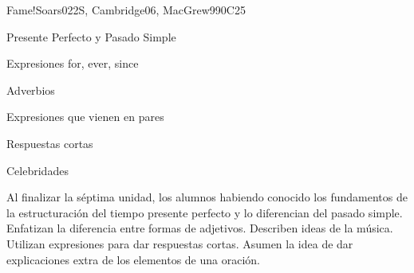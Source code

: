 \begin{syllabus}
\begin{unit}{Fame!}{}{Soars022S, Cambridge06, MacGrew99}{0}{C25}
   \begin{topics}
      \item Presente Perfecto y Pasado Simple
      \item Expresiones for, ever, since
      \item Adverbios
      \item Expresiones que vienen en pares 
      \item Respuestas cortas
      \item Celebridades
   \end{topics}

   \begin{learningoutcomes}
      \item Al finalizar la séptima unidad, los alumnos habiendo conocido los fundamentos de la estructuración del tiempo presente perfecto y lo diferencian del pasado simple. Enfatizan la diferencia entre formas de adjetivos. Describen ideas de la música. Utilizan expresiones para dar respuestas cortas. Asumen la idea de dar explicaciones extra de los elementos de una oración.
   \end{learningoutcomes}
\end{unit}

\begin{coursebibliography}
\end{coursebibliography}

\end{syllabus}
%
